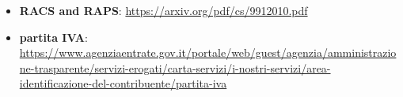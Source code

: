 \begin{itemize}
    \item \textbf{\ac{RACS} and \ac{RAPS}}: \url{https://arxiv.org/pdf/cs/9912010.pdf}
    \item \textbf{\gls{partita IVA}}: \url{https://www.agenziaentrate.gov.it/portale/web/guest/agenzia/amministrazione-trasparente/servizi-erogati/carta-servizi/i-nostri-servizi/area-identificazione-del-contribuente/partita-iva}
\end{itemize}
\clearpage